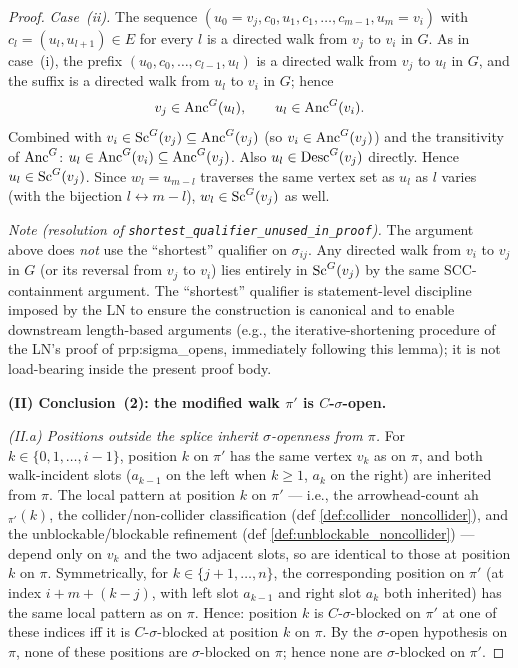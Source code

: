 \begin{Lem}[LabelRoman]
\begin{proof}
\smallskip\noindent\emph{Case~(ii).} The sequence $(u_0 = v_j, c_0, u_1, c_1, \dots, c_{m-1}, u_m = v_i)$ with $c_l = (u_l, u_{l+1}) \in E$ for every $l$ is a directed walk from $v_j$ to $v_i$ in $G$. As in case~(i), the prefix $(u_0, c_0, \dots, c_{l-1}, u_l)$ is a directed walk from $v_j$ to $u_l$ in $G$, and the suffix is a directed walk from $u_l$ to $v_i$ in $G$; hence
\[
    v_j \in \mathrm{Anc}^G(u_l), \qquad
    u_l \in \mathrm{Anc}^G(v_i).
\]
Combined with $v_i \in \mathrm{Sc}^G(v_j) \subseteq \mathrm{Anc}^G(v_j)$ (so $v_i \in \mathrm{Anc}^G(v_j)$) and the transitivity of $\mathrm{Anc}^G$: $u_l \in \mathrm{Anc}^G(v_i) \subseteq \mathrm{Anc}^G(v_j)$. Also $u_l \in \mathrm{Desc}^G(v_j)$ directly. Hence $u_l \in \mathrm{Sc}^G(v_j)$. Since $w_l = u_{m-l}$ traverses the same vertex set as $u_l$ as $l$ varies (with the bijection $l \leftrightarrow m - l$), $w_l \in \mathrm{Sc}^G(v_j)$ as well.

\smallskip\noindent\emph{Note (resolution of \texttt{shortest\_qualifier\_unused\_in\_proof}).}
The argument above does \emph{not} use the ``shortest'' qualifier on $\sigma_{ij}$. Any directed walk from $v_i$ to $v_j$ in $G$ (or its reversal from $v_j$ to $v_i$) lies entirely in $\mathrm{Sc}^G(v_j)$ by the same SCC-containment argument. The ``shortest'' qualifier is statement-level discipline imposed by the LN to ensure the construction is canonical and to enable downstream length-based arguments (e.g., the iterative-shortening procedure of the LN's proof of prp:sigma\_opens, immediately following this lemma); it is not load-bearing inside the present proof body.

\medskip\noindent\textbf{(II) Conclusion~(2): the modified walk $\pi'$ is $C$-$\sigma$-open.}

\smallskip\noindent\emph{(II.a) Positions outside the splice inherit $\sigma$-openness from $\pi$.}
For $k \in \{0, 1, \dots, i - 1\}$, position $k$ on $\pi'$ has the same vertex $v_k$ as on $\pi$, and both walk-incident slots ($a_{k-1}$ on the left when $k \ge 1$, $a_k$ on the right) are inherited from $\pi$. The local pattern at position $k$ on $\pi'$ — i.e., the arrowhead-count ah$_{\pi'}(k)$, the collider/non-collider classification (def \ref{def:collider_noncollider}), and the unblockable/blockable refinement (def \ref{def:unblockable_noncollider}) — depend only on $v_k$ and the two adjacent slots, so are identical to those at position $k$ on $\pi$. Symmetrically, for $k \in \{j + 1, \dots, n\}$, the corresponding position on $\pi'$ (at index $i + m + (k - j)$, with left slot $a_{k-1}$ and right slot $a_k$ both inherited) has the same local pattern as on $\pi$. Hence: position $k$ is $C$-$\sigma$-blocked on $\pi'$ at one of these indices iff it is $C$-$\sigma$-blocked at position $k$ on $\pi$. By the $\sigma$-open hypothesis on $\pi$, none of these positions are $\sigma$-blocked on $\pi$; hence none are $\sigma$-blocked on $\pi'$.


\end{proof}
\end{Lem}
